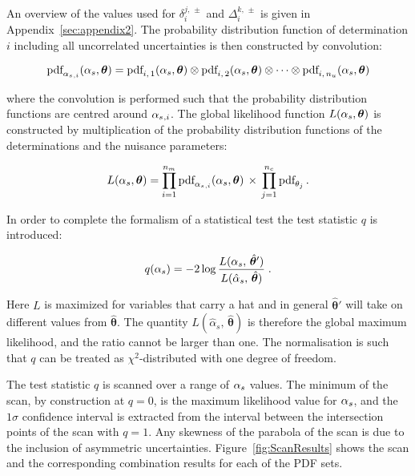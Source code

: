 % 
An overview of the values used for $\delta_i^{j,\,\pm}$ and $\Delta_i^{k,\,\pm}$
is given in Appendix~\ref{sec:appendix2}.
% 
The probability distribution function of determination $i$ including
all uncorrelated uncertainties is then constructed by convolution:
% 
\begin{linenomath*}
\begin{equation}
\text{pdf}_{ \alpha_s {}_{,i} }(\alpha_s, \bm{\theta}) =
    \text{pdf}_{i,\,1}(\alpha_s, \bm{\theta}) \otimes \text{pdf}_{i,\,2}(\alpha_s, \bm{\theta})
    \otimes \cdots
    \otimes \text{pdf}_{i,\,n_u}(\alpha_s, \bm{\theta})
\end{equation}
\end{linenomath*}
% 
where the convolution is performed such that the probability distribution
functions are centred around $\alpha_s{}_{,i}$.
% 
% 
The global likelihood function $L( \alpha_s , \bm{\theta} )$ is constructed
by multiplication of the probability distribution functions of the
determinations and the nuisance parameters:
% 
\begin{linenomath*}
\begin{equation}
L( \alpha_s , \bm{\theta} ) = 
    \prod_{i=1}^{n_m} \text{pdf}_{ \alpha_s {}_{,i} }(\alpha_s, \bm{\theta})
    \, \times \,
    \prod_{j=1}^{n_c} \text{pdf}_{\theta_j}
    \,.
    \label{eq:globallikelihoodfunction}
\end{equation}
\end{linenomath*}
% 
In order to complete the formalism of a statistical test the test
statistic $q$ is introduced:
%
\begin{linenomath*}
\begin{equation}
q( \alpha_s ) = -2 \log \frac{ L( \alpha_s ,\, \hat{\bm{\theta}}' ) }{ L( \hat{\alpha}_s ,\, \hat{\bm{\theta}} ) }
\;.
\end{equation}
\end{linenomath*}
% 
Here $L$ is maximized for variables that carry a hat and in general
$\hat{\bm{\theta}}'$ will take on different values from
$\hat{\bm{\theta}}$.
%
The quantity $L( \hat{\alpha}_s ,\, \hat{\bm{\theta}} )$ is therefore
the global maximum likelihood, and the ratio cannot be larger than
one. 
%
The normalisation is such
that $q$ can be treated as $\chi^2$-distributed with one degree of
freedom.

The test statistic $q$ is scanned over a range of $\alpha_s$ values. The
minimum of the scan, by construction at $q=0$, is the maximum
likelihood value for $\alpha_s$, and the $1\sigma$ confidence interval is
extracted from the interval between the intersection points of the
scan with $q=1$. Any skewness of the parabola of the scan is due to
the inclusion of asymmetric uncertainties.
Figure~\ref{fig:ScanResults} shows the scan and the corresponding
combination results for each of the PDF sets. 

